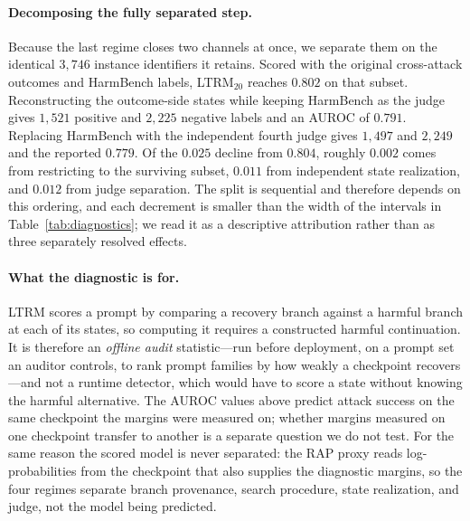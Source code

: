 \documentclass[11pt]{article}
\newcommand{\ltrm}{LTRM}
\begin{document}
\paragraph{Decomposing the fully separated step.}
Because the last regime closes two channels at once, we separate them on the
identical \(3{,}746\) instance identifiers it retains. Scored with the original
cross-attack outcomes and HarmBench labels, \ltrm{}\(_{20}\) reaches \(0.802\) on
that subset. Reconstructing the outcome-side states while keeping HarmBench as
the judge gives \(1{,}521\) positive and \(2{,}225\) negative labels and an AUROC
of \(0.791\). Replacing HarmBench with the independent fourth judge gives
\(1{,}497\) and \(2{,}249\) and the reported \(0.779\). Of the \(0.025\) decline
from \(0.804\), roughly \(0.002\) comes from restricting to the surviving
subset, \(0.011\) from independent state realization, and \(0.012\) from judge
separation. The split is sequential and therefore depends on this ordering, and
each decrement is smaller than the width of the intervals in
Table~\ref{tab:diagnostics}; we read it as a descriptive attribution rather than
as three separately resolved effects.

\paragraph{What the diagnostic is for.}
\ltrm{} scores a prompt by comparing a recovery branch against a harmful branch
at each of its states, so computing it requires a constructed harmful
continuation. It is therefore an \emph{offline audit} statistic---run before
deployment, on a prompt set an auditor controls, to rank prompt families by how
weakly a checkpoint recovers---and not a runtime detector, which would have to
score a state without knowing the harmful alternative. The AUROC values above
predict attack success on the same checkpoint the margins were measured on;
whether margins measured on one checkpoint transfer to another is a separate
question we do not test. For the same reason the scored model is never separated:
the RAP proxy reads log-probabilities from the checkpoint that also supplies the
diagnostic margins, so the four regimes separate branch provenance, search
procedure, state realization, and judge, not the model being predicted.
\end{document}
